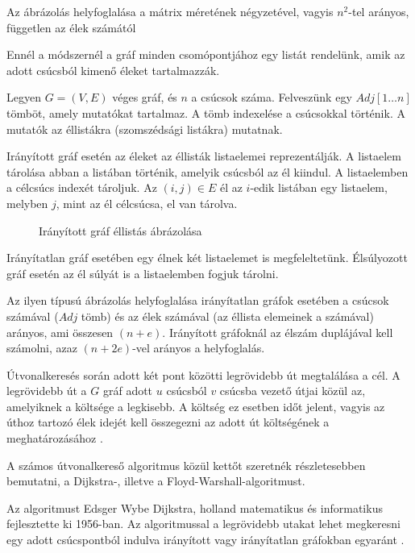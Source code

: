 Az ábrázolás helyfoglalása a mátrix méretének négyzetével, vagyis $n^2$-tel arányos, független az élek számától


Ennél a módszernél a gráf minden csomópontjához egy listát rendelünk, amik az adott csúcsból kimenő éleket tartalmazzák.

Legyen $G = (V, E)$ véges gráf, és $n$ a csúcsok száma. Felveszünk egy $Adj[1 \ldots n]$ tömböt, amely mutatókat tartalmaz. A tömb indexelése a csúcsokkal történik. A mutatók az éllistákra (szomszédsági listákra) mutatnak.

Irányított gráf esetén az éleket az éllisták listaelemei reprezentálják. A listaelem tárolása abban a listában történik, amelyik csúcsból az él kiindul. A listaelemben a célcsúcs indexét tároljuk. Az $(i, j) \in E$ él az $i$-edik listában egy listaelem, melyben $j$, mint az él célcsúcsa, el van tárolva.

\begin{figure}
\centering

\caption{Irányított gráf éllistás ábrázolása}
\label{fig:ellista_iranyitott}
\end{figure}

Irányítatlan gráf esetében egy élnek két listaelemet is megfeleltetünk. Élsúlyozott gráf esetén az él súlyát is a listaelemben fogjuk tárolni.

Az ilyen típusú ábrázolás helyfoglalása irányítatlan gráfok esetében a csúcsok számával ($Adj$ tömb) és az élek számával (az éllista elemeinek a számával) arányos, ami összesen $(n + e)$. Irányított gráfoknál az élszám duplájával kell számolni, azaz $(n + 2e)$-vel arányos a helyfoglalás.


Útvonalkeresés során adott két pont közötti legrövidebb út megtalálása a cél. A legrövidebb út a $G$ gráf adott $u$ csúcsból $v$ csúcsba vezető útjai közül az, amelyiknek a költsége a legkisebb. A költség ez esetben időt jelent, vagyis az úthoz tartozó élek idejét kell összegezni az adott út költségének a meghatározásához \cite{legrovidebbut}.


A számos útvonalkereső algoritmus közül kettőt szeretnék részletesebben bemutatni, a Dijkstra-, illetve a Floyd-Warshall-algoritmust.


Az algoritmust Edsger Wybe Dijkstra, holland matematikus és informatikus fejlesztette ki 1956-ban. Az algoritmussal a legrövidebb utakat lehet megkeresni egy adott csúcspontból indulva irányított vagy irányítatlan gráfokban egyaránt \cite{dijkstra}.

